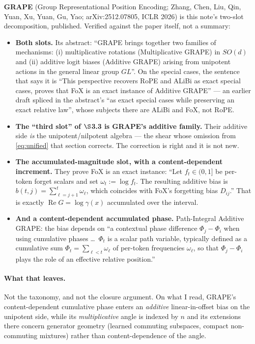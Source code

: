 \documentclass[11pt]{article}
\begin{document}
\textbf{GRAPE} (Group Representational Position Encoding;
Zhang, Chen, Liu, Qin, Yuan, Xu, Yuan, Gu, Yao; arXiv:2512.07805, ICLR 2026) is
this note's two-slot decomposition, published. Verified against the paper itself,
not a summary:

\begin{itemize}\itemsep2pt
\item \textbf{Both slots.} Its abstract: ``GRAPE brings together two families of
  mechanisms: (i) multiplicative rotations (Multiplicative GRAPE) in $SO(d)$ and
  (ii) additive logit biases (Additive GRAPE) arising from unipotent actions in
  the general linear group $GL$''. On the special cases, the sentence that says it
  is ``This perspective recovers RoPE and ALiBi as exact special cases, proves that
  FoX is an exact instance of Additive GRAPE'' --- an earlier draft spliced in the
  abstract's ``as exact special cases while preserving an exact relative law'',
  whose subjects there are ALiBi and FoX, not RoPE.
\item \textbf{The ``third slot'' of $\S$3.3 is GRAPE's additive family.} Their
  additive side \emph{is} the unipotent/nilpotent algebra --- the shear whose
  omission from \eqref{eq:unified} that section corrects. The correction is right
  and it is not new.
\item \textbf{The accumulated-magnitude slot, with a content-dependent
  increment.} They prove FoX is an exact instance: ``Let $f_t\in(0,1]$ be
  per-token forget scalars and set $\omega_t := \log f_t$. The resulting additive
  bias is $b(t,j)=\sum_{\ell=j+1}^{t}\omega_\ell$, which coincides with FoX's
  forgetting bias $D_{ij}$.'' That is exactly $\operatorname{Re}G = \log\gamma(x)$
  accumulated over the interval.
\item \textbf{And a content-dependent accumulated phase.} Path-Integral Additive
  GRAPE: the bias depends on ``a contextual phase difference $\Phi_j-\Phi_i$ when
  using cumulative phases \dots\ $\Phi_t$ is a scalar path variable, typically
  defined as a cumulative sum $\Phi_t = \sum_{\ell<t}\omega_\ell$ of per-token
  frequencies $\omega_\ell$, so that $\Phi_j - \Phi_i$ plays the role of an
  effective relative position.''
\end{itemize}

\paragraph{What that leaves.} Not the taxonomy, and not the closure argument. On
what I read, GRAPE's content-dependent cumulative phase enters an \emph{additive}
linear-in-offset bias on the unipotent side, while its \emph{multiplicative}
angle is indexed by $n$ and its extensions there concern generator geometry
(learned commuting subspaces, compact non-commuting mixtures) rather than
content-dependence of the angle.
\end{document}
